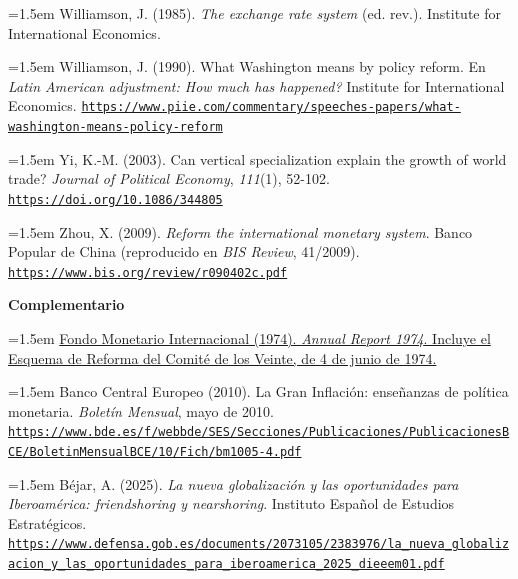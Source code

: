 \documentclass[10pt,a4paper]{article}
\begin{document}
{\sloppy\noindent\hangindent=1.5em Williamson, J. (1985). \textit{The exchange rate system} (ed. rev.). Institute for International Economics.\par}

{\sloppy\noindent\hangindent=1.5em Williamson, J. (1990). What Washington means by policy reform. En \textit{Latin American adjustment: How much has happened?} Institute for International Economics. \href{https://www.piie.com/commentary/speeches-papers/what-washington-means-policy-reform}{\nolinkurl{https://www.piie.com/commentary/speeches-papers/what-washington-means-policy-reform}}\par}

{\sloppy\noindent\hangindent=1.5em Yi, K.-M. (2003). Can vertical specialization explain the growth of world trade? \textit{Journal of Political Economy}, \textit{111}(1), 52-102. \href{https://doi.org/10.1086/344805}{\nolinkurl{https://doi.org/10.1086/344805}}\par}

{\sloppy\noindent\hangindent=1.5em Zhou, X. (2009). \textit{Reform the international monetary system}. Banco Popular de China (reproducido en \textit{BIS Review}, 41/2009). \href{https://www.bis.org/review/r090402c.pdf}{\nolinkurl{https://www.bis.org/review/r090402c.pdf}}\par}

\textbf{Complementario}

{\sloppy\noindent\hangindent=1.5em \href{https://imf.org/external/pubs/ft/ar/archive/pdf/ar1974.pdf}{Fondo Monetario Internacional (1974). \textit{Annual Report 1974}. Incluye el Esquema de Reforma del Comité de los Veinte, de 4 de junio de 1974.}\par}

{\sloppy\noindent\hangindent=1.5em Banco Central Europeo (2010). La Gran Inflación: enseñanzas de política monetaria. \textit{Boletín Mensual}, mayo de 2010. \href{https://www.bde.es/f/webbde/SES/Secciones/Publicaciones/PublicacionesBCE/BoletinMensualBCE/10/Fich/bm1005-4.pdf}{\nolinkurl{https://www.bde.es/f/webbde/SES/Secciones/Publicaciones/PublicacionesBCE/BoletinMensualBCE/10/Fich/bm1005-4.pdf}}\par}

{\sloppy\noindent\hangindent=1.5em Béjar, A. (2025). \textit{La nueva globalización y las oportunidades para Iberoamérica: friendshoring y nearshoring}. Instituto Español de Estudios Estratégicos. \href{https://www.defensa.gob.es/documents/2073105/2383976/la_nueva_globalizacion_y_las_oportunidades_para_iberoamerica_2025_dieeem01.pdf}{\nolinkurl{https://www.defensa.gob.es/documents/2073105/2383976/la_nueva_globalizacion_y_las_oportunidades_para_iberoamerica_2025_dieeem01.pdf}}\par}
\end{document}
